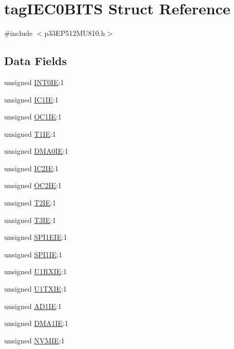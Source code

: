 \hypertarget{structtag_i_e_c0_b_i_t_s}{}\section{tag\+I\+E\+C0\+B\+I\+TS Struct Reference}
\label{structtag_i_e_c0_b_i_t_s}


{\ttfamily \#include $<$p33\+E\+P512\+M\+U810.\+h$>$}

\subsection*{Data Fields}
\begin{DoxyCompactItemize}
\item 
unsigned \hyperlink{structtag_i_e_c0_b_i_t_s_a35711f92541b36401c4a6a1575cb18ea}{I\+N\+T0\+IE}\+:1
\item 
unsigned \hyperlink{structtag_i_e_c0_b_i_t_s_a3202830867e9ab16a01f1f1320b1788f}{I\+C1\+IE}\+:1
\item 
unsigned \hyperlink{structtag_i_e_c0_b_i_t_s_a19adfcda6097360b72a0286b253bc874}{O\+C1\+IE}\+:1
\item 
unsigned \hyperlink{structtag_i_e_c0_b_i_t_s_ad88f248e4f0997546d019bf6a0fc7234}{T1\+IE}\+:1
\item 
unsigned \hyperlink{structtag_i_e_c0_b_i_t_s_a5f9537c559e2f2b2bcd730419681fa23}{D\+M\+A0\+IE}\+:1
\item 
unsigned \hyperlink{structtag_i_e_c0_b_i_t_s_a1abe1ddb95580d6d37650733d6365d34}{I\+C2\+IE}\+:1
\item 
unsigned \hyperlink{structtag_i_e_c0_b_i_t_s_aca15db1f831024f0283727253c707918}{O\+C2\+IE}\+:1
\item 
unsigned \hyperlink{structtag_i_e_c0_b_i_t_s_a458ab280b2b9454229ca8950df9692d2}{T2\+IE}\+:1
\item 
unsigned \hyperlink{structtag_i_e_c0_b_i_t_s_a1114e087f5216703b0b64c2245f15823}{T3\+IE}\+:1
\item 
unsigned \hyperlink{structtag_i_e_c0_b_i_t_s_a06d4eeb73f9569ea179b4ae9acb23dbe}{S\+P\+I1\+E\+IE}\+:1
\item 
unsigned \hyperlink{structtag_i_e_c0_b_i_t_s_a405a4fd3254d2fb2d3ea669c5d79a14a}{S\+P\+I1\+IE}\+:1
\item 
unsigned \hyperlink{structtag_i_e_c0_b_i_t_s_a58c780e10d0e091bf7ae7015cfb2df61}{U1\+R\+X\+IE}\+:1
\item 
unsigned \hyperlink{structtag_i_e_c0_b_i_t_s_a1793c03968c989df28da7e323b14c4e9}{U1\+T\+X\+IE}\+:1
\item 
unsigned \hyperlink{structtag_i_e_c0_b_i_t_s_a9082cb963db6d166282ec69782f5ec5d}{A\+D1\+IE}\+:1
\item 
unsigned \hyperlink{structtag_i_e_c0_b_i_t_s_ac926b3cf01a007340d1d38603d7bc00b}{D\+M\+A1\+IE}\+:1
\item 
unsigned \hyperlink{structtag_i_e_c0_b_i_t_s_ae19be7d4c2dc22e6852188ad8c792ec3}{N\+V\+M\+IE}\+:1
\end{DoxyCompactItemize}


